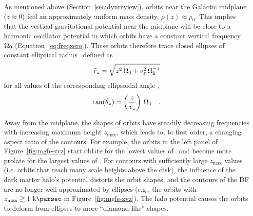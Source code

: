 As mentioned above (Section~\ref{sec:dynreview}), orbits near the Galactic midplane ($z
\approx 0$) feel an approximately uniform mass density, $\rho(z) \approx \rho_0$.
This implies that the vertical gravitational potential near the midplane will be close
to a harmonic oscillator potential in which orbits have a constant vertical frequency
$\Omega_0$ (Equation~\ref{eq:freqzero}).
These orbits therefore trace closed ellipses of constant elliptical radius \rzp\ defined
as
\begin{equation}
    \tilde{r}_z = \sqrt{z^2 \, \Omega_0 + v_z^2 \, \Omega_0^{-1}} \label{eq:rzp}
\end{equation}
for all values of the corresponding ellipsoidal angle \thzp,
\begin{equation}
    \tan (\tilde{\theta}_z) = \left(\frac{z}{v_z}\right) \, \Omega_0 \quad .
    \label{eq:thetazp}
\end{equation}

Away from the midplane, the shapes of orbits have steadily decreasing frequencies with
increasing maximum height $z_{\textrm{max}}$, which leads to, to first order, a changing
aspect ratio of the contours.
For example, the orbits in the left panel of Figure~\ref{fig:mgfe-zvz} start oblate for
the lowest values of \zmax\ and become more prolate for the largest values of \zmax.
For contours with sufficiently large $z_{\textrm{max}}$ values (i.e. orbits that reach
many scale heights above the disk), the influence of the dark matter halo's potential
distorts the orbit shapes, and the contours of the DF are no longer well-approximated by
ellipses (e.g., the orbits with $\zmax \gtrsim 1~\kpc$ in Figure~\ref{fig:mgfe-zvz}).
The halo potential causes the orbits to deform from ellipses to more ``diamond-like''
shapes.

